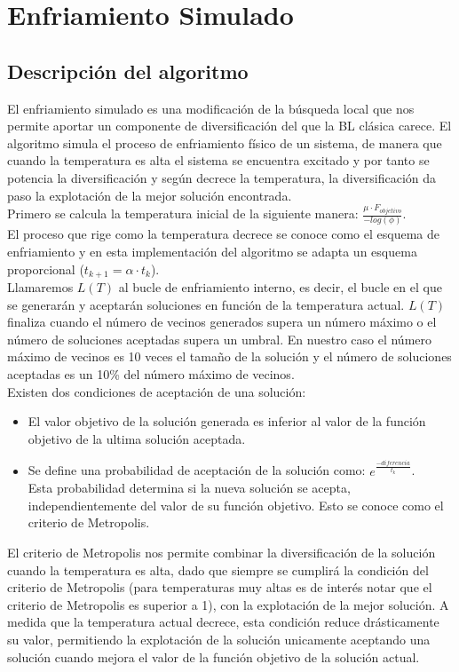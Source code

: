 \newpage
\section{Enfriamiento Simulado}
\subsection{Descripción del algoritmo}
El enfriamiento simulado es una modificación de la búsqueda local que nos permite aportar un componente de diversificación del que la BL clásica carece. El algoritmo simula el proceso de enfriamiento físico de un sistema, de manera que cuando la temperatura es alta el sistema se encuentra excitado y por tanto se potencia la diversificación y según decrece la temperatura, la diversificación da paso la explotación de la mejor solución encontrada. \\
Primero se calcula la temperatura inicial de la siguiente manera: $ \frac{\mu \cdot F_{objetivo}}{-log(\phi)} $. \\
El proceso que rige como la temperatura decrece se conoce como el esquema de enfriamiento y en esta implementación del algoritmo se adapta un esquema proporcional ($t_{k+1} = \alpha \cdot t_{k}$).\\
Llamaremos $L(T)$ al bucle de enfriamiento interno, es decir, el bucle en el que se generarán y aceptarán soluciones en función de la temperatura actual. $L(T)$ finaliza cuando el número de vecinos generados supera un número máximo o el número de soluciones aceptadas supera un umbral.
En nuestro caso el número máximo de vecinos es 10 veces el tamaño de la solución y el número de soluciones aceptadas es un 10\% del número máximo de vecinos.\\
Existen dos condiciones de aceptación de una solución:
\begin{itemize}
   \item El valor objetivo de la solución generada es inferior al valor de la función objetivo de la ultima solución aceptada.
   \item Se define una probabilidad de aceptación de la solución como: $e^{\frac{-diferencia}{t_{k}}}$.\\
   Esta probabilidad determina si la nueva solución se acepta, independientemente del valor de su función objetivo. Esto se conoce como el criterio de Metropolis.
\end{itemize}
El criterio de Metropolis nos permite combinar la diversificación de la solución cuando la temperatura es alta, dado que siempre se cumplirá la condición del criterio de Metropolis (para temperaturas muy altas es de interés notar que el criterio de Metropolis es superior a 1), con la explotación de la mejor solución. A medida que la temperatura actual decrece, esta condición reduce drásticamente su valor, permitiendo la explotación de la solución unicamente aceptando una solución cuando mejora el valor de la función objetivo de la solución actual.
